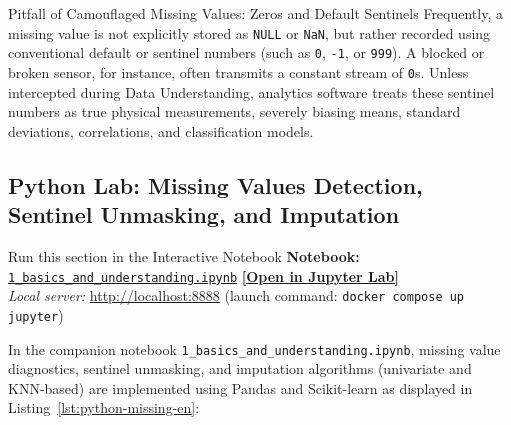 \begin{alertblock}{Pitfall of Camouflaged Missing Values: Zeros and Default Sentinels}
Frequently, a missing value is not explicitly stored as \texttt{NULL} or \texttt{NaN}, but rather recorded using conventional default or sentinel numbers (such as \texttt{0}, \texttt{-1}, or \texttt{999}). A blocked or broken sensor, for instance, often transmits a constant stream of \texttt{0}s.
Unless intercepted during Data Understanding, analytics software treats these sentinel numbers as true physical measurements, severely biasing means, standard deviations, correlations, and classification models.
\end{alertblock}

\subsection{Python Lab: Missing Values Detection, Sentinel Unmasking, and Imputation}
\label{subsec:lab-python-missing-en}
\begin{noteblock}{Run this section in the Interactive Notebook}
\textbf{Notebook:} \href{http://localhost:8888/lab/tree/notebooks/1_basics_and_understanding.ipynb}{\texttt{1\_basics\_and\_understanding.ipynb}} \hfill \href{http://localhost:8888/lab/tree/notebooks/1_basics_and_understanding.ipynb}{\textbf{[Open in Jupyter Lab]}} \\
\textit{Local server:} \url{http://localhost:8888} \quad (launch command: \texttt{docker compose up jupyter})
\end{noteblock}
In the companion notebook \texttt{1\_basics\_and\_understanding.ipynb}, missing value diagnostics, sentinel unmasking, and imputation algorithms (univariate and KNN-based) are implemented using Pandas and Scikit-learn as displayed in Listing~\ref{lst:python-missing-en}:

